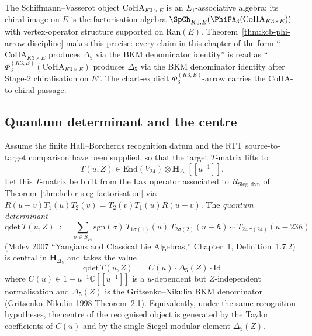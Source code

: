 \begin{remark}
\label{rem:kcb-phi-discipline}
The Schiffmann--Vasserot object $\mathrm{CoHA}_{K3\times E}$ is an
$E_1$-associative algebra; its chiral image on $E$ is the
factorisation algebra
$\SpCh_{K3, E}(\PhiFA_3(\mathrm{CoHA}_{K3\times E}))$ with
vertex-operator structure supported on $\mathrm{Ran}(E)$.
Theorem~\ref{thm:kcb-phi-arrow-discipline} makes this precise: every
claim in this chapter of the form ``$\mathrm{CoHA}_{K3\times E}$
produces $\Delta_5$ via the BKM denominator identity'' is read as
``$\Phi_3^{(K3, E)}(\mathrm{CoHA}_{K3\times E})$ produces $\Delta_5$
via the BKM denominator identity after Stage-$2$ chiralisation on
$E$''. The chart-explicit $\Phi_3^{(K3, E)}$-arrow carries the
CoHA-to-chiral passage.
\end{remark}

\subsection{Quantum determinant and the centre}
\label{subsec:kcb-quantum-determinant}

\begin{theorem}
\label{thm:kcb-quantum-determinant}
Assume the finite Hall--Borcherds recognition datum and the RTT
source-to-target comparison have been supplied, so that the target
\(T\)-matrix lifts to
\[
T(u, Z)\in\mathrm{End}(V_{24})\otimes\mathbf{H}_{\Delta_5}[[u^{-1}]].
\]
Let this \(T\)-matrix be built from the Lax operator associated to
$R_{\mathrm{Sieg,dyn}}$ of Theorem~\ref{thm:kcb-r-sieg-factorisation}
via $R(u-v)T_1(u)T_2(v) = T_2(v)T_1(u)R(u-v)$. The \emph{quantum
determinant}
\[
 \mathrm{qdet}\,T(u, Z)
 \;:=\;
 \sum_{\sigma\in S_{24}}
 \mathrm{sgn}(\sigma)\,
 T_{1\sigma(1)}(u)\,T_{2\sigma(2)}(u-\hbar)\,\cdots\,
 T_{24\,\sigma(24)}(u-23\hbar)
\]
(Molev 2007 \textup{``Yangians and Classical Lie Algebras,''}
Chapter~1, Definition~1.7.2) is central in $\mathbf{H}_{\Delta_5}$ and
takes the value
\[
 \boxed{\;\mathrm{qdet}\,T(u, Z)
 \;=\; C(u)\cdot \Delta_5(Z)\cdot\mathrm{Id}\;}
\]
where $C(u)\in 1+u^{-1}\mathbb{C}[[u^{-1}]]$ is a $u$-dependent but
$Z$-independent normalisation and $\Delta_5(Z)$ is the
Gritsenko--Nikulin BKM denominator (Gritsenko--Nikulin 1998
Theorem~2.1). Equivalently, under the same recognition hypotheses, the
centre of the recognised object is generated by the Taylor coefficients
of \(C(u)\) and by the single Siegel-modular element \(\Delta_5(Z)\).
\end{theorem}

